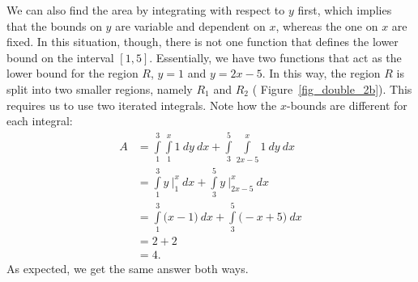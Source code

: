 \begin{example}
We can also find the area by integrating with respect to $y$ first, which implies that the bounds on $y$ are variable and dependent on $x$, whereas the one on $x$ are fixed. In this situation, though, there is not one function that defines the lower bound on the interval $[1,5]$. Essentially, we have two functions that act as the lower bound for the region $R$, $y=1$ and $y=2x-5$. In this way, the region $R$ is split into two smaller regions, namely $R_1$ and $R_2$ ( Figure~\ref{fig_double_2b}). This requires us to use two iterated integrals. Note how the $x$-bounds are different for each integral:
\begin{align*}
A &= \int\limits_1^3\int\limits_1^x 1\ dy \ dx +  \int\limits_3^5\int\limits_{2x-5}^x1\ dy\ dx\\
	&= \int\limits_1^3 y\ \Big|_1^x\ dx  + \int\limits_3^5 y \  \Big|_{2x-5}^x\ dx\\
	&= \int\limits_1^3\big(x-1\big)\ dx  +  \int\limits_3^5\big(-x+5\big)\ dx \\
	&= 2  +  2 \\
	&=4.
\end{align*}
As expected, we get the same answer both ways.
\end{example}


